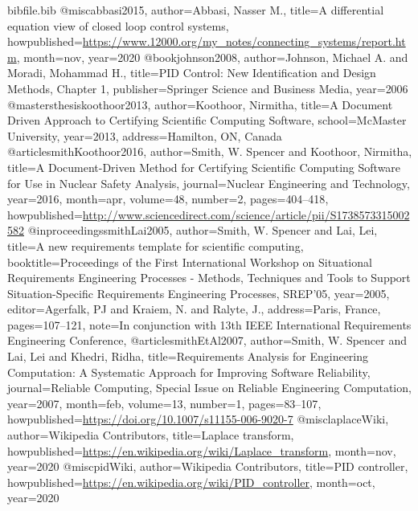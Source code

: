 \documentclass[12pt]{article}
\begin{document}
\begin{filecontents*}{bibfile.bib}
@misc{abbasi2015,
author={Abbasi, Nasser M.},
title={A differential equation view of closed loop control systems},
howpublished={\url{https://www.12000.org/my\_notes/connecting\_systems/report.htm}},
month=nov,
year={2020}}
@book{johnson2008,
author={Johnson, Michael A. and Moradi, Mohammad H.},
title={PID Control: New Identification and Design Methods, Chapter 1},
publisher={Springer Science and Business Media},
year={2006}}
@mastersthesis{koothoor2013,
author={Koothoor, Nirmitha},
title={A Document Driven Approach to Certifying Scientific Computing Software},
school={McMaster University},
year={2013},
address={Hamilton, ON, Canada}}
@article{smithKoothoor2016,
author={Smith, W. Spencer and Koothoor, Nirmitha},
title={A Document-Driven Method for Certifying Scientific Computing Software for Use in Nuclear Safety Analysis},
journal={Nuclear Engineering and Technology},
year={2016},
month=apr,
volume={48},
number={2},
pages={404--418},
howpublished={\url{http://www.sciencedirect.com/science/article/pii/S1738573315002582}}}
@inproceedings{smithLai2005,
author={Smith, W. Spencer and Lai, Lei},
title={A new requirements template for scientific computing},
booktitle={Proceedings of the First International Workshop on Situational Requirements Engineering Processes - Methods, Techniques and Tools to Support Situation-Specific Requirements Engineering Processes, SREP'05},
year={2005},
editor={Agerfalk, PJ and Kraiem, N. and Ralyte, J.},
address={Paris, France},
pages={107--121},
note={In conjunction with 13th IEEE International Requirements Engineering Conference,}}
@article{smithEtAl2007,
author={Smith, W. Spencer and Lai, Lei and Khedri, Ridha},
title={Requirements Analysis for Engineering Computation: A Systematic Approach for Improving Software Reliability},
journal={Reliable Computing, Special Issue on Reliable Engineering Computation},
year={2007},
month=feb,
volume={13},
number={1},
pages={83--107},
howpublished={\url{https://doi.org/10.1007/s11155-006-9020-7}}}
@misc{laplaceWiki,
author={Wikipedia Contributors},
title={Laplace transform},
howpublished={\url{https://en.wikipedia.org/wiki/Laplace\_transform}},
month=nov,
year={2020}}
@misc{pidWiki,
author={Wikipedia Contributors},
title={PID controller},
howpublished={\url{https://en.wikipedia.org/wiki/PID\_controller}},
month=oct,
year={2020}}
\end{filecontents*}
\nocite{*}
\printbibliography[heading=none]
\end{document}
